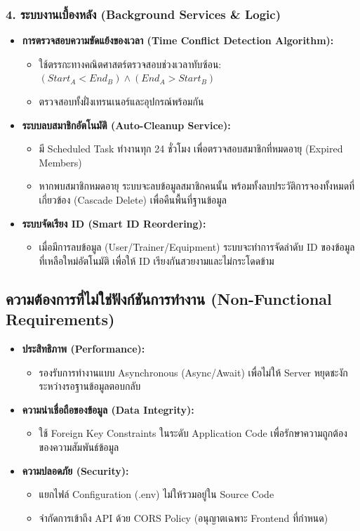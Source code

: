 \subsubsection{4. ระบบงานเบื้องหลัง (Background Services \& Logic)}
\begin{itemize}
    \item \textbf{การตรวจสอบความขัดแย้งของเวลา (Time Conflict Detection Algorithm):}
    \begin{itemize}
        \item ใช้ตรรกะทางคณิตศาสตร์ตรวจสอบช่วงเวลาทับซ้อน: $(Start_A < End_B) \land (End_A > Start_B)$
        \item ตรวจสอบทั้งฝั่งเทรนเนอร์และอุปกรณ์พร้อมกัน
    \end{itemize}
    \item \textbf{ระบบลบสมาชิกอัตโนมัติ (Auto-Cleanup Service):}
    \begin{itemize}
        \item มี Scheduled Task ทำงานทุก 24 ชั่วโมง เพื่อตรวจสอบสมาชิกที่หมดอายุ (Expired Members)
        \item หากพบสมาชิกหมดอายุ ระบบจะลบข้อมูลสมาชิกคนนั้น พร้อมทั้งลบประวัติการจองทั้งหมดที่เกี่ยวข้อง (Cascade Delete) เพื่อคืนพื้นที่ฐานข้อมูล
    \end{itemize}
    \item \textbf{ระบบจัดเรียง ID (Smart ID Reordering):}
    \begin{itemize}
        \item เมื่อมีการลบข้อมูล (User/Trainer/Equipment) ระบบจะทำการจัดลำดับ ID ของข้อมูลที่เหลือใหม่อัตโนมัติ เพื่อให้ ID เรียงกันสวยงามและไม่กระโดดข้าม
    \end{itemize}
\end{itemize}

\subsection{ความต้องการที่ไม่ใช่ฟังก์ชันการทำงาน (Non-Functional Requirements)}
\begin{itemize}
    \item \textbf{ประสิทธิภาพ (Performance):}
    \begin{itemize}
        \item รองรับการทำงานแบบ Asynchronous (Async/Await) เพื่อไม่ให้ Server หยุดชะงักระหว่างรอฐานข้อมูลตอบกลับ
    \end{itemize}
    \item \textbf{ความน่าเชื่อถือของข้อมูล (Data Integrity):}
    \begin{itemize}
        \item ใช้ Foreign Key Constraints ในระดับ Application Code เพื่อรักษาความถูกต้องของความสัมพันธ์ข้อมูล
    \end{itemize}
    \item \textbf{ความปลอดภัย (Security):}
    \begin{itemize}
        \item แยกไฟล์ Configuration (.env) ไม่ให้รวมอยู่ใน Source Code
        \item จำกัดการเข้าถึง API ด้วย CORS Policy (อนุญาตเฉพาะ Frontend ที่กำหนด)
    \end{itemize}
\end{itemize}

